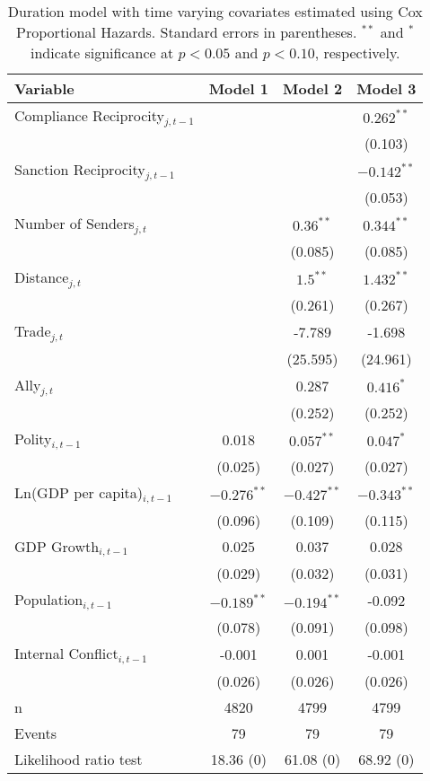 \begin{table}[ht]
\centering
{\normalsize
\begin{tabular}{lccc}
 Variable & Model 1 & Model 2 & Model 3 \\ 
  \hline
\hline
Compliance Reciprocity$_{j,t-1}$ &  &  & $0.262^{\ast\ast}$ \\ 
   &  &  & (0.103) \\ 
  Sanction Reciprocity$_{j,t-1}$ &  &  & $-0.142^{\ast\ast}$ \\ 
   &  &  & (0.053) \\ 
   \hline
Number of Senders$_{j,t}$ &  & $0.36^{\ast\ast}$ & $0.344^{\ast\ast}$ \\ 
   &  & (0.085) & (0.085) \\ 
  Distance$_{j,t}$ &  & $1.5^{\ast\ast}$ & $1.432^{\ast\ast}$ \\ 
   &  & (0.261) & (0.267) \\ 
  Trade$_{j,t}$ &  & -7.789 & -1.698 \\ 
   &  & (25.595) & (24.961) \\ 
  Ally$_{j,t}$ &  & 0.287 & $0.416^{\ast}$ \\ 
   &  & (0.252) & (0.252) \\ 
   \hline
Polity$_{i,t-1}$ & 0.018 & $0.057^{\ast\ast}$ & $0.047^{\ast}$ \\ 
   & (0.025) & (0.027) & (0.027) \\ 
  Ln(GDP per capita)$_{i,t-1}$ & $-0.276^{\ast\ast}$ & $-0.427^{\ast\ast}$ & $-0.343^{\ast\ast}$ \\ 
   & (0.096) & (0.109) & (0.115) \\ 
  GDP Growth$_{i,t-1}$ & 0.025 & 0.037 & 0.028 \\ 
   & (0.029) & (0.032) & (0.031) \\ 
  Population$_{i,t-1}$ & $-0.189^{\ast\ast}$ & $-0.194^{\ast\ast}$ & -0.092 \\ 
   & (0.078) & (0.091) & (0.098) \\ 
  Internal Conflict$_{i,t-1}$ & -0.001 & 0.001 & -0.001 \\ 
   & (0.026) & (0.026) & (0.026) \\ 
   \hline
n & 4820 & 4799 & 4799 \\ 
  Events & 79 & 79 & 79 \\ 
  Likelihood ratio test & 18.36 (0) & 61.08 (0) & 68.92 (0) \\ 
   \hline
\hline
\end{tabular}
}
\caption{Duration model with time varying covariates estimated using Cox Proportional Hazards. Standard errors in parentheses. $^{**}$ and $^{*}$ indicate significance at $p< 0.05 $ and $p< 0.10 $, respectively.} 
\label{tab:regResults}
\end{table}
